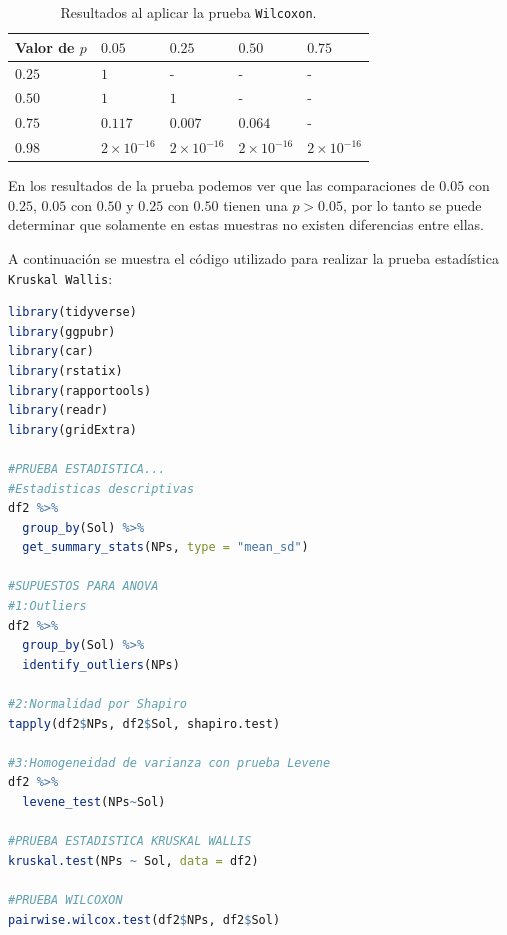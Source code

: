 \documentclass[3p,times,twocolumn]{elsarticle}
\begin{document}
\begin{table}[ht]
\centering
\caption{Resultados al aplicar la prueba \texttt{Wilcoxon}.}
\smallskip

\begin{tabular}{|p{1.5cm}|p{1.2cm}|p{1.2cm}|p{1.2cm}|p{1.2cm}|}
 \hline
Valor de $p$ & $0.05$ & $0.25$ & $0.50$ & $0.75$\\
 \hline
 $0.25$ & $1$ & - & - & - \\
 \hline
 $0.50$ & $1$ & $1$ & - & -\\
 \hline
  $0.75$ & $0.117$ & $0.007$ & $0.064$ & - \\
 \hline
  $0.98$ & $2\times 10^{-16}$ & $2\times 10^{-16}$ & $2\times 10^{-16}$ & $2\times 10^{-16}$ \\
 \hline
\end{tabular}
\label{Cuadro4}
\end{table}

En los resultados de la prueba podemos ver que las comparaciones de $0.05$ con $0.25$, $0.05$ con $0.50$ y $0.25$ con $0.50$ tienen una $p > 0.05$, por lo tanto se puede determinar que solamente en estas muestras no existen diferencias entre ellas. 

A continuación se muestra el código utilizado para realizar la prueba estadística \texttt{Kruskal Wallis}:

\lstset{style=mystyle}
\begin{lstlisting}[language=R, caption= Código para graficar y realizar la prueba estadística \texttt{Kruskal Wallis}.]
library(tidyverse)
library(ggpubr)
library(car)
library(rstatix)
library(rapportools)
library(readr)
library(gridExtra)

#PRUEBA ESTADISTICA...
#Estadisticas descriptivas
df2 %>%
  group_by(Sol) %>%
  get_summary_stats(NPs, type = "mean_sd")

#SUPUESTOS PARA ANOVA
#1:Outliers
df2 %>%
  group_by(Sol) %>%
  identify_outliers(NPs)

#2:Normalidad por Shapiro
tapply(df2$NPs, df2$Sol, shapiro.test)

#3:Homogeneidad de varianza con prueba Levene
df2 %>%
  levene_test(NPs~Sol)

#PRUEBA ESTADISTICA KRUSKAL WALLIS
kruskal.test(NPs ~ Sol, data = df2)

#PRUEBA WILCOXON
pairwise.wilcox.test(df2$NPs, df2$Sol)
\end{lstlisting}
\end{document}
